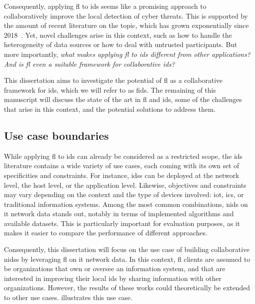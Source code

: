 Consequently, applying \gls{fl} to \gls{ids} seems like a promising approach to collaboratively improve the local detection of cyber threats.
This is supported by the amount of recent literature on the topic, which has grown exponentially since 2018~\cite{lavaur_EvolutionFederatedLearningbased_2022,ismaila_ReviewApproachesFederated_2024}.
Yet, novel challenges arise in this context, such as how to handle the heterogeneity of data sources or how to deal with untrusted participants.
But more importantly, \emph{what makes applying \gls{fl} to \gls{ids} different from other applications? And is \gls{fl} even a suitable framework for collaborative \gls{ids}?}

This dissertation aims to investigate the potential of \acrlong{fl} as a collaborative framework for \acrlong{ids}, which we will refer to as \gls{fids}.
The remaining of this manuscript will discuss the state of the art in \gls{fl} and \gls{ids}, some of the challenges that arise in this context, and the potential solutions to address them.


\subsection{Use case boundaries\label{sec:intro.context.usecase}}

While applying \gls{fl} to \gls{ids} can already be considered as a restricted scope, the \gls{ids} literature contains a wide variety of use cases, each coming with its own set of specificities and constraints.
For instance, \glspl{ids} can be deployed at the network level, the host level, or the application level.
Likewise, objectives and constraints may vary depending on the context and the type of devices involved: \gls{iot}, \gls{ics}, or traditional information systems.
Among the most common combinations, \gls{nids} on \gls{it} network data stands out, notably in terms of implemented algorithms and available datasets.
This is particularly important for evaluation purposes, as it makes it easier to compare the performance of different approaches.

Consequently, this dissertation will focus on the use case of building collaborative \glspl{nids} by leveraging \gls{fl} on \gls{it} network data.
In this context, \gls{fl} clients are assumed to be organizations that own or oversee an information system, and that are interested in improving their local \gls{ids} by sharing information with other organizations.
However, the results of these works could theoretically be extended to other use cases.
 illustrates this use case.

